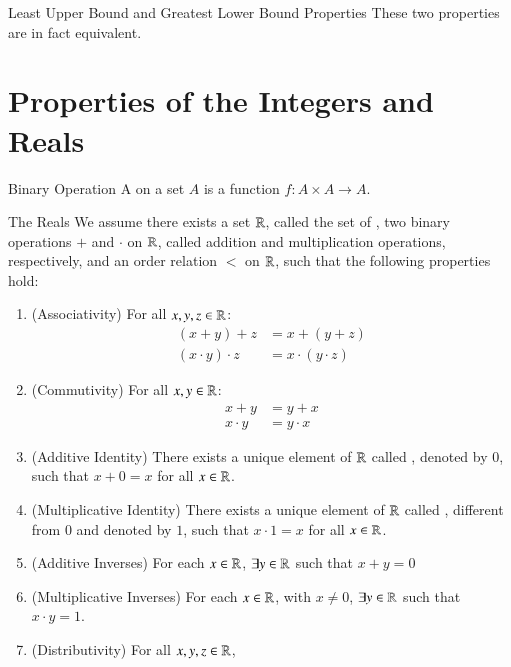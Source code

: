 \documentclass[12pt, a4paper, twoside, openright, titlepage]{book}
\begin{document}
\begin{appendices}
\begin{defn}{Least Upper Bound and Greatest Lower Bound Properties}{}
        These two properties are in fact equivalent.
    \end{defn}


    \section{Properties of the Integers and Reals}


    \begin{defn}{Binary Operation}{}
        A  on a set $A$ is a function $f:A\times A\rightarrow A$.
    \end{defn}


    \begin{cons}{The Reals}{}
        We assume there exists a set $\mathbb R$, called the set of , two binary operations $+$ and $\cdot$ on $\mathbb R$, called addition and multiplication operations, respectively, and an order relation $<$ on $\mathbb R$, such that the following properties hold: \begin{enumerate}
            \item (Associativity) For all $x,y,z \in \mathbb R$:\begin{align}
                    (x+y)+z &= x+(y+z) \\
                    (x\cdot y)\cdot z &= x\cdot (y\cdot z) 
                \end{align}
            \item (Commutivity) For all $x,y \in \mathbb R$:\begin{align}
                x+y &= y+x \\
                x\cdot y &= y \cdot x
                \end{align}
            \item (Additive Identity) There exists a unique element of $\mathbb R$ called , denoted by $0$, such that $x+0 = x$ for all $x \in \mathbb R$.
            \item (Multiplicative Identity) There exists a unique element of $\mathbb R$ called , different from $0$ and denoted by $1$, such that $x\cdot 1 = x$ for all $x \in \mathbb R$.
            \item (Additive Inverses) For each $x \in\mathbb R$, $\exists y \in \mathbb R$ such that $x+y = 0$
            \item (Multiplicative Inverses) For each $x \in \mathbb R$, with $x \neq 0$, $\exists y \in \mathbb R$ such that $x\cdot y = 1$.
            \item (Distributivity) For all $x,y,z \in \mathbb R$, \begin{equation}

\end{equation}
\end{enumerate}
\end{cons}
\end{appendices}
\end{document}
